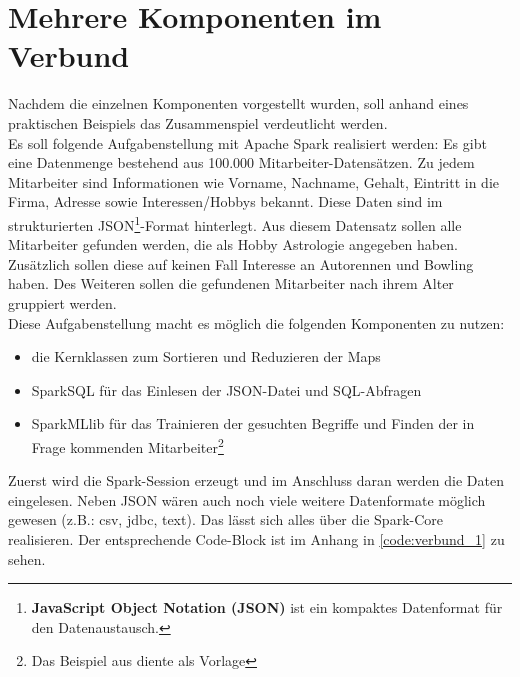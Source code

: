 

\newpage
\section{Mehrere Komponenten im Verbund}\label{sec_verbund}

Nachdem die einzelnen Komponenten vorgestellt wurden, soll anhand eines praktischen Beispiels das Zusammenspiel verdeutlicht werden. \\

\noindent
Es soll folgende Aufgabenstellung mit Apache Spark realisiert werden: Es gibt eine Datenmenge bestehend aus 100.000 Mitarbeiter-Datensätzen. Zu jedem Mitarbeiter sind Informationen wie Vorname, Nachname, Gehalt, Eintritt in die Firma, Adresse sowie Interessen/Hobbys bekannt. Diese Daten sind im strukturierten JSON\footnote{\textbf{JavaScript Object Notation (JSON)} ist ein kompaktes Datenformat für den Datenaustausch. }-Format hinterlegt. 
Aus diesem Datensatz sollen alle Mitarbeiter gefunden werden, die als Hobby Astrologie angegeben haben. Zusätzlich sollen diese auf keinen Fall Interesse an Autorennen und Bowling haben. Des Weiteren sollen die gefundenen Mitarbeiter nach ihrem Alter gruppiert werden. \\
Diese Aufgabenstellung macht es möglich die folgenden Komponenten zu nutzen:
\begin{itemize}
	\item die Kernklassen zum Sortieren und Reduzieren der Maps
	\item SparkSQL für das Einlesen der JSON-Datei und SQL-Abfragen
	\item SparkMLlib für das Trainieren der gesuchten Begriffe und Finden der in Frage kommenden Mitarbeiter\footnote{Das Beispiel aus \cite{GITHUB_EXAMPLE} diente als Vorlage}	
\end{itemize}  

\noindent
Zuerst wird die Spark-Session erzeugt und im Anschluss daran werden die Daten eingelesen. Neben JSON wären auch noch viele weitere Datenformate möglich gewesen (z.B.: csv, jdbc, text). Das lässt sich alles über die Spark-Core realisieren. Der entsprechende Code-Block ist im Anhang in \autoref{code:verbund_1} zu sehen.\\

